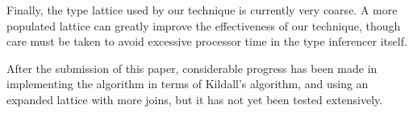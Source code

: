 Finally, the type lattice used by our technique is currently very
coarse.  A more populated lattice can greatly improve the
effectiveness of our technique, though care must be taken to avoid
excessive processor time in the type inferencer itself.

After the submission of this paper, considerable progress has been made in implementing the algorithm in terms of Kildall's algorithm, and using an expanded lattice with more joins, but it has not yet been tested extensively.

